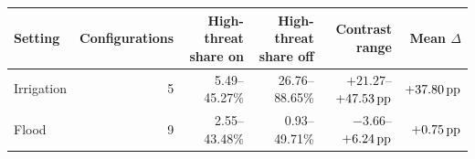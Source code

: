 \begin{tabular}{lrrrrr}
\toprule
Setting & Configurations & High-threat share on & High-threat share off & Contrast range & Mean $\Delta$ \\
\midrule
Irrigation & 5 & 5.49--45.27\% & 26.76--88.65\% & $+21.27$--$+47.53\,\mathrm{pp}$ & $+37.80\,\mathrm{pp}$ \\
Flood & 9 & 2.55--43.48\% & 0.93--49.71\% & $-3.66$--$+6.24\,\mathrm{pp}$ & $+0.75\,\mathrm{pp}$ \\
\bottomrule
\end{tabular}
